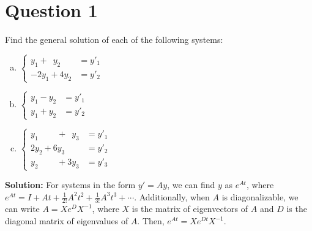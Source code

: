 \documentclass{article}
\begin{document}
\section*{Question 1}
Find the general solution of each of the following systems:
\begin{enumerate}[a.]
    \item $\left\{\begin{aligned}
        y_1 + \phantom{4} y_2 &= y'_1 \\
        -2y_1 + 4y_2 &= y'_2
    \end{aligned}\right.$
    \item $\left\{\begin{aligned}
        y_1 - y_2 &= y'_1 \\
        y_1 + y_2 &= y'_2
    \end{aligned}\right.$
    \item $\left\{\begin{aligned}
        y_1 \phantom{+ 2y_2} + \phantom{6} y_3 &= y'_1 \\
        2y_2 + 6y_3 &= y'_2 \\
        y_2 \phantom{+ 2y_2} + 3y_3 &= y'_3
    \end{aligned}\right.$
\end{enumerate}

\vspace{0.25cm}\noindent\textbf{Solution:}
For systems in the form $y' = Ay$, we can find $y$ as $e^{At}$, where $e^{At} = I + At + \frac{1}{2!}A^2t^2 + \frac{1}{3!}A^3t^3 + \cdots$.
Additionally, when $A$ is diagonalizable, we can write $A = Xe^D X^{-1}$, where $X$ is the matrix of eigenvectors of $A$ and $D$ is the diagonal matrix of eigenvalues of $A$.
Then, $e^{At} = X e^{Dt} X^{-1}$.
\end{document}
